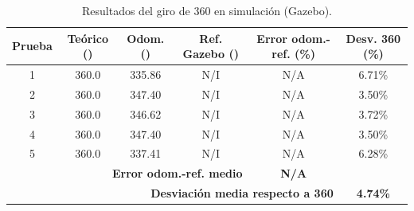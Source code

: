 \begin{table}[H]
\centering
\caption{Resultados del giro de 360\textdegree{} en simulaci\'on (Gazebo).}
\label{tab:odom_giro_sim}
\small
\begin{tabular}{cccccc}
\hline
\textbf{Prueba} & \textbf{Te\'orico (\textdegree{})} & \textbf{Odom. (\textdegree{})} & \textbf{Ref. Gazebo (\textdegree{})} & \textbf{Error odom.-ref. (\%)} & \textbf{Desv. 360\textdegree{} (\%)} \\
\hline
1 & 360.0 & 335.86 & N/I & N/A & 6.71\% \\
2 & 360.0 & 347.40 & N/I & N/A & 3.50\% \\
3 & 360.0 & 346.62 & N/I & N/A & 3.72\% \\
4 & 360.0 & 347.40 & N/I & N/A & 3.50\% \\
5 & 360.0 & 337.41 & N/I & N/A & 6.28\% \\
\hline
\multicolumn{4}{r}{\textbf{Error odom.-ref. medio}} & \textbf{N/A} & \\
\multicolumn{5}{r}{\textbf{Desviaci\'on media respecto a 360\textdegree{}}} & \textbf{4.74\%} \\
\hline
\end{tabular}
\end{table}